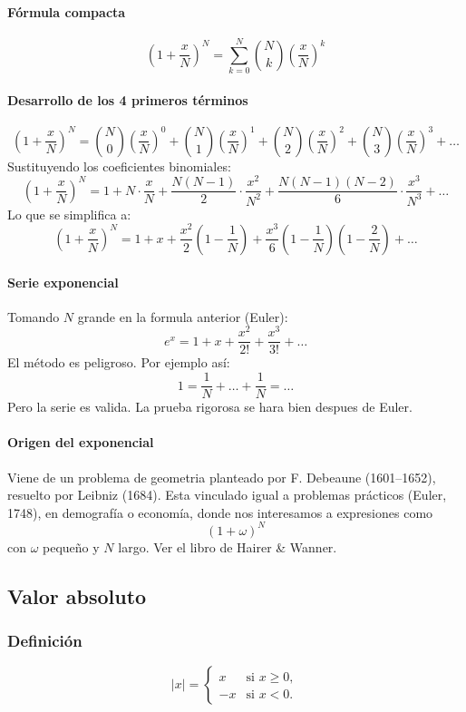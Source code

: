 \documentclass[12pt, a4paper]{article}
\theoremstyle{rioplatense}
\begin{document}
\paragraph{Fórmula compacta}
\[
\left(1 + \frac{x}{N}\right)^N = \sum_{k=0}^N \binom{N}{k} \left(\frac{x}{N}\right)^k
\]

\paragraph{Desarrollo de los 4 primeros términos}
\[
\left(1 + \frac{x}{N}\right)^N = \binom{N}{0} \left(\frac{x}{N}\right)^0 + \binom{N}{1} \left(\frac{x}{N}\right)^1 + \binom{N}{2} \left(\frac{x}{N}\right)^2 + \binom{N}{3} \left(\frac{x}{N}\right)^3 + \dots %
\]
Sustituyendo los coeficientes binomiales:
\[
\left(1 + \frac{x}{N}\right)^N = 1 + N \cdot \frac{x}{N} + \frac{N(N-1)}{2} \cdot \frac{x^2}{N^2} + \frac{N(N-1)(N-2)}{6} \cdot \frac{x^3}{N^3} + \dots %
\]
Lo que se simplifica a:
\[
\left(1 + \frac{x}{N}\right)^N = 1 + x + \frac{x^2}{2} \left(1 - \frac{1}{N}\right) + \frac{x^3}{6} \left(1 - \frac{1}{N}\right)\left(1 - \frac{2}{N}\right) + \dots %
\]
\paragraph{Serie exponencial}
Tomando $N$ grande en la formula anterior (Euler):
\[
e^x =  1 + x + \frac{x^2}{2!} + \frac{x^3}{3!}  + \dots
\]
El método es peligroso. Por ejemplo así:
\[
1 = \frac{1}{N} + \ldots + \frac{1}{N} = \dots
\]
Pero la serie es valida. La prueba rigorosa se hara bien despues de Euler.

\paragraph{Origen del exponencial} Viene de un problema de geometria planteado por F. Debeaune (1601--1652), resuelto por Leibniz (1684). Esta vinculado igual a problemas prácticos (Euler, 1748), en demografía o economía, donde nos interesamos a expresiones como
\[
(1 + \omega )^N
\]
con $\omega$ pequeño y $N$ largo. Ver el libro de Hairer \& Wanner.
\subsection{Valor absoluto}

\subsubsection{Definición}
\[
|x| =
\begin{cases}
x & \text{si } x \geq 0, \\
-x & \text{si } x < 0.
\end{cases}
\]
\end{document}
